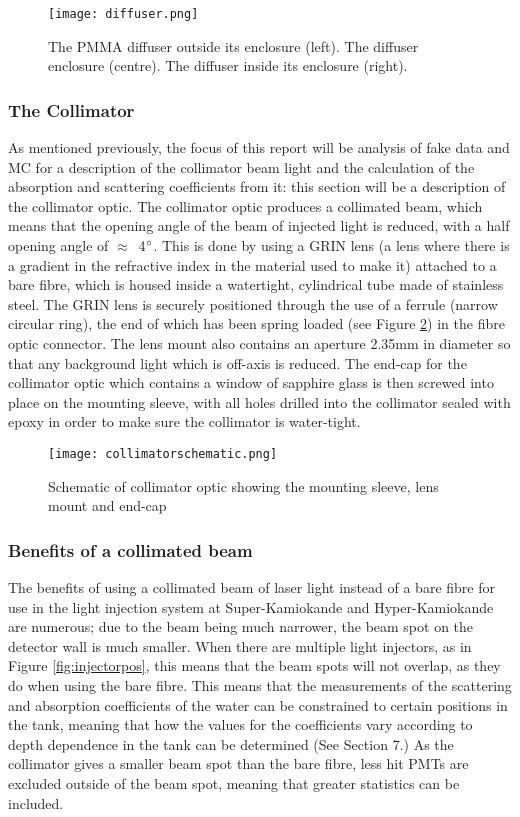 \documentclass[11pt,oneside,a4paper]{article}
\begin{document}
\begin{figure}[htbp]
	\centering
	\texttt{[image: diffuser.png]}
	\caption{The PMMA diffuser outside its enclosure (left). The diffuser enclosure
		(centre). The diffuser inside its enclosure (right).}
	\label{fig:diffuser}
\end{figure}



\subsubsection{The Collimator}
As mentioned previously, the focus of this report will be analysis of fake data and MC for a description of the collimator beam light and the calculation of the absorption and scattering coefficients from it: this section will be a description of the collimator optic. The collimator optic produces a collimated beam, which means that the opening angle of the beam of injected light is reduced, with a half opening angle of $\approx$~4$\degree$. This is done by using a GRIN lens (a lens where there is a gradient in the refractive index in the material used to make it) attached to a bare fibre, which is housed inside a watertight, cylindrical tube made of stainless steel. The GRIN lens is securely positioned through the use of a ferrule (narrow circular ring), the end of which has been spring loaded (see Figure \ref{fig:collimatorschematic}) in the fibre optic connector. The lens mount also contains an aperture 2.35mm in diameter so that any background light which is off-axis is reduced. The end-cap for the collimator optic which contains a window of sapphire glass is then screwed into place on the mounting sleeve, with all holes drilled into the collimator sealed with epoxy in order to make sure the collimator is water-tight. 


\begin{figure}[htbp]
	\centering
	\texttt{[image: collimatorschematic.png]}
	\caption{Schematic of collimator optic showing the mounting sleeve, lens mount and end-cap}
	\label{fig:collimatorschematic}
\end{figure}

\subsubsection{Benefits of a collimated beam} 
The benefits of using a collimated beam of laser light instead of a bare fibre for use in the light injection system at Super-Kamiokande and Hyper-Kamiokande are numerous; due to the beam being much narrower, the beam spot on the detector wall is much smaller. When there are multiple light injectors, as in Figure \ref{fig:injectorpos}, this means that the beam spots will not overlap, as they do when using the bare fibre. This means that the measurements of the scattering and absorption coefficients of the water can be constrained to certain positions in the tank, meaning that how the values for the coefficients vary according to depth dependence in the tank can be determined (See Section 7.) As the collimator gives a smaller beam spot than the bare fibre, less hit PMTs are excluded outside of the beam spot, meaning that greater statistics can be included. 
\end{document}
